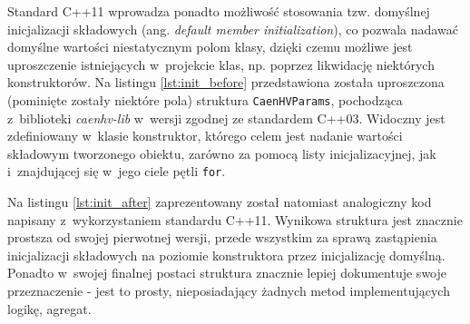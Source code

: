 \clearpage



Standard C++11 wprowadza ponadto możliwość stosowania tzw. domyślnej inicjalizacji składowych (ang. \emph{default member initialization}), co pozwala nadawać domyślne wartości niestatycznym polom klasy, dzięki czemu możliwe jest uproszczenie istniejących w~projekcie klas, np. poprzez likwidację niektórych konstruktorów. Na listingu \ref{lst:init_before} przedstawiona została uproszczona (pominięte zostały niektóre pola) struktura \lstinline{CaenHVParams}, pochodząca z~biblioteki \emph{caenhv-lib} w~wersji zgodnej ze standardem C++03. Widoczny jest zdefiniowany w~klasie konstruktor, którego celem jest nadanie wartości składowym tworzonego obiektu, zarówno za pomocą listy inicjalizacyjnej, jak i~znajdującej się w~jego ciele pętli \lstinline{for}.





Na listingu \ref{lst:init_after} zaprezentowany został natomiast analogiczny kod napisany z~wykorzystaniem standardu C++11. Wynikowa struktura jest znacznie prostsza od swojej pierwotnej wersji, przede wszystkim za sprawą zastąpienia inicjalizacji składowych na poziomie konstruktora przez inicjalizację domyślną. Ponadto w~swojej finalnej postaci struktura znacznie lepiej dokumentuje swoje przeznaczenie - jest to prosty, nieposiadający żadnych metod implementujących logikę, agregat. 

\clearpage


